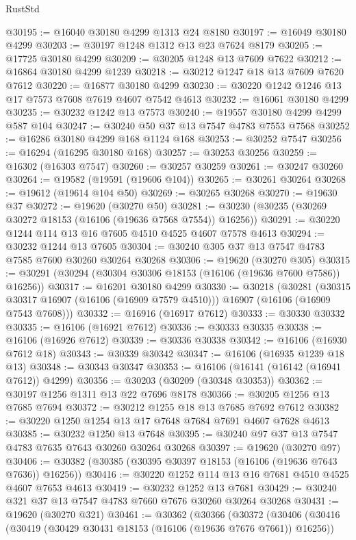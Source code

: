\begin{lexlean}{RustStd}
\begin{coremodule}
@30195 := @16040 @30180 @4299 @1313 @24 @8180
@30197 := @16049 @30180 @4299
@30203 := @30197 @1248 @1312 @13 @23 @7624 @8179
@30205 := @17725 @30180 @4299
@30209 := @30205 @1248 @13 @7609 @7622
@30212 := @16864 @30180 @4299 @1239
@30218 := @30212 @1247 @18 @13 @7609 @7620 @7612
@30220 := @16877 @30180 @4299
@30230 := @30220 @1242 @1246 @13 @17 @7573 @7608 @7619 @4607 @7542 @4613
@30232 := @16061 @30180 @4299
@30235 := @30232 @1242 @13 @7573
@30240 := @19557 @30180 @4299 @4299 @587 @104
@30247 := @30240 @50 @37 @13 @7547 @4783 @7553 @7568
@30252 := @16286 @30180 @4299 @168 @1124 @168
@30253 := @30252 @7547
@30256 := @16294 (@16295 @30180 @168)
@30257 := @30253 @30256
@30259 := @16302 (@16303 @7547)
@30260 := @30257 @30259
@30261 := @30247 @30260
@30264 := @19582 (@19591 (@19606 @104))
@30265 := @30261 @30264
@30268 := @19612 (@19614 @104 @50)
@30269 := @30265 @30268
@30270 := @19630 @37
@30272 := @19620 (@30270 @50)
@30281 := @30230 (@30235 (@30269 @30272 @18153 (@16106 (@19636 @7568 @7554)) @16256))
@30291 := @30220 @1244 @114 @13 @16 @7605 @4510 @4525 @4607 @7578 @4613
@30294 := @30232 @1244 @13 @7605
@30304 := @30240 @305 @37 @13 @7547 @4783 @7585 @7600 @30260 @30264 @30268
@30306 := @19620 (@30270 @305)
@30315 := @30291 (@30294 (@30304 @30306 @18153 (@16106 (@19636 @7600 @7586)) @16256))
@30317 := @16201 @30180 @4299
@30330 := @30218
    (@30281
      (@30315 @30317 @16907 (@16106 (@16909 @7579 @4510)))
      @16907
      (@16106 (@16909 @7543 @7608)))
@30332 := @16916 (@16917 @7612)
@30333 := @30330 @30332
@30335 := @16106 (@16921 @7612)
@30336 := @30333 @30335
@30338 := @16106 (@16926 @7612)
@30339 := @30336 @30338
@30342 := @16106 (@16930 @7612 @18)
@30343 := @30339 @30342
@30347 := @16106 (@16935 @1239 @18 @13)
@30348 := @30343 @30347
@30353 := @16106 (@16141 (@16142 (@16941 @7612)) @4299)
@30356 := @30203 (@30209 (@30348 @30353))
@30362 := @30197 @1256 @1311 @13 @22 @7696 @8178
@30366 := @30205 @1256 @13 @7685 @7694
@30372 := @30212 @1255 @18 @13 @7685 @7692 @7612
@30382 := @30220 @1250 @1254 @13 @17 @7648 @7684 @7691 @4607 @7628 @4613
@30385 := @30232 @1250 @13 @7648
@30395 := @30240 @97 @37 @13 @7547 @4783 @7635 @7643 @30260 @30264 @30268
@30397 := @19620 (@30270 @97)
@30406 := @30382 (@30385 (@30395 @30397 @18153 (@16106 (@19636 @7643 @7636)) @16256))
@30416 := @30220 @1252 @114 @13 @16 @7681 @4510 @4525 @4607 @7653 @4613
@30419 := @30232 @1252 @13 @7681
@30429 := @30240 @321 @37 @13 @7547 @4783 @7660 @7676 @30260 @30264 @30268
@30431 := @19620 (@30270 @321)
@30461 := @30362
    (@30366
      (@30372
        (@30406
          (@30416
            (@30419 (@30429 @30431 @18153 (@16106 (@19636 @7676 @7661)) @16256))

\end{coremodule}
\end{lexlean}
